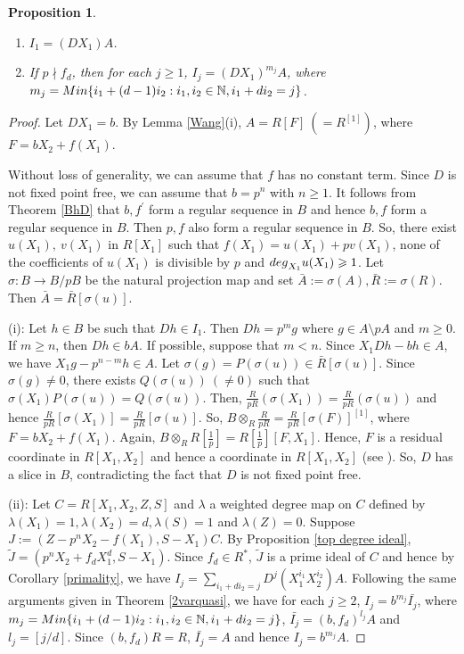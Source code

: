 \documentclass[a4paper,12pt]{article}
\newtheorem{prop}[thm]{Proposition}
\newcommand{\bN}{\mathbb N}
\begin{document}
{\begin{prop}
\begin{enumerate}
	\item [\rm(i)]	$I_1=(DX_1)A$.
	\item [\rm(ii)] If $p\nmid f_d$, then for each $j\geqslant 1$, $I_j={(DX_1)}^{m_j}A$, where $m_j={\rm Min}\{i_1+(d-1)i_2:i_1,i_2\in\bN,i_1+di_2=j\}$.
\end{enumerate}

\end{prop}

\begin{proof} Let $DX_1=b$. By Lemma \ref{Wang}(i), $A=R[F]~(=R^{[1]})$, where $F=bX_2+f(X_1)$.

\noindent
Without loss of generality, we can assume that $f$ has no constant term. Since $D$ is not fixed point free, we can assume that $b=p^n$ with $n\geqslant 1$. It follows from Theorem \ref{BhD} that $b,f^{\prime}$ form a regular sequence in $B$ and hence $b,f$ form a regular sequence in $B$. Then $p,f$ also form a regular sequence in $B$. So, there exist $u(X_1),~v(X_1)$ in $R[X_1]$ such that $f(X_1)=u(X_1)+pv(X_1)$, none of the coefficients of $u(X_1)$ is divisible by $p$ and ${\rm deg}_{X_1} u(X_1)\geqslant 1$. Let $\sigma:B\longrightarrow{B/pB}$ be the natural projection map and set $\bar{A}:=\sigma(A), \bar{R}:=\sigma(R)$. Then $\bar{A}=\bar{R}[\sigma(u)]$. 

\medskip\noindent
(i): Let $h\in B$ be such that $Dh\in I_1$. Then $Dh={p}^{m}g$ where $g\in A\setminus pA$ and $m\geqslant 0$. If $m\geqslant n$, then $Dh\in bA$. If possible, suppose that $m<n$. Since $X_1Dh-bh\in A$, we have $X_1g-p^{n-m}h\in A$. Let $\sigma(g)=P(\sigma(u))\in{\bar{R}[\sigma(u)]}$. Since $\sigma(g)\neq 0$, there exists $ Q(\sigma(u))~(\neq 0)$ such that $\sigma(X_1)P(\sigma(u))=Q(\sigma(u))$.  Then, $\frac{R}{pR}(\sigma(X_1))=\frac{R}{pR}(\sigma(u))$ and hence $\frac{R}{pR}[\sigma(X_1)]=\frac{R}{pR}[\sigma(u)]$.  So, $B\otimes_R\frac{R}{pR}=\frac{R}{pR}[\sigma(F)]^{[1]}$, where $F=bX_2+f(X_1)$. Again, $B\otimes_RR[\frac{1}{p}]=R[\frac{1}{p}][F,X_1]$.  Hence, $F$ is a residual coordinate in $R[X_1,X_2]$ and hence a coordinate in $R[X_1,X_2]$ (see \cite[Theorem 3.2]{BD1}).
So, $D$ has a slice in $B$, contradicting the fact that $D$ is not fixed point free. 

\medskip\noindent
(ii): Let $C=R[X_1,X_2,Z,S]$ and $\lambda$ a weighted degree map on $C$ defined by $\lambda(X_1)=1,\lambda(X_2)=d,\lambda(S)=1$ and $\lambda(Z)=0$. Suppose $J:=(Z-p^nX_2-f(X_1),S-X_1)C$. By Proposition \ref{top degree ideal}, $\widetilde{J}=(p^nX_2+f_dX_1^d,S-X_1)$. Since $f_d\in R^{*}$, $\widetilde{J}$ is a prime ideal of $C$ and hence by Corollary \ref{primality}, we have $I_j=\underset{i_1+di_2=j}\sum D ^j(X_1^{i_1}X_2^{i_2}) A$. Following the same arguments given in Theorem \ref{2varquasi}, we have for each $j\geqslant 2$, $I_j=b^{m_j}\bar{I_j}$, where $m_j={\rm Min}\{i_1+(d-1)i_2:i_1,i_2\in\bN,i_1+di_2=j\}$, $\bar{I_j}={(b,f_d)}^{l_j}A$ and $l_j=[j/d].$ Since $(b,f_d)R=R$, $\bar{I_j}=A$ and hence $I_j=b^{m_j}A$.
\end{proof}

}
\end{document}
